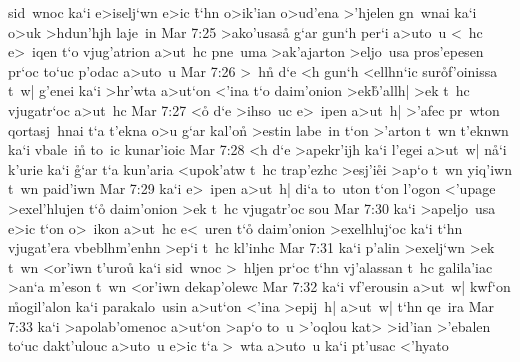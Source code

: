 sid~wnoc
ka`i
e>iselj`wn
e>ic
\r{t}`hn
o>ik'ian
o>ud'ena
>'hjelen
gn~wnai
ka`i
o>uk
>hdun'hjh
laje~in\bibvsend
\vs Mar 7:25
>ako'usasa\r{}
g`ar
gun`h
per`i
a>uto~u
<~hc
e>~iqen
t`o
vjug'atrion
a>ut~hc
pne~uma
>ak'ajarton
>eljo~usa
pros'epesen
pr`oc
to`uc
p'odac
a>uto~u\bibvsend
\vs Mar 7:26
>~hn\r{}
d`e
<h
gun`h
<ellhn`ic
sur\r{o}f'oinissa
t~w|
g'enei
ka`i
>hr'wta
a>ut`on
<'ina
t`o
daim'onion
>ek\r{b}'allh|
>ek
t~hc
vjugatr`oc
a>ut~hc\bibvsend
\vs Mar 7:27
<o\r{}
d`e
>ihso~uc
e>~ipen
a>ut~h|
>'afec
pr~wton
qortasj~hnai
t`a
t'ekna
o>u
g`ar
kal'on\r{}
>estin
labe~in
t`on
>'arton
t~wn
t'eknwn
ka`i
vbale~in\r{}
to~ic
kunar'ioic\bibvsend
\vs Mar 7:28
<h
d`e
>apekr'ijh
ka`i
l'egei
a>ut~w|
n\r{a}`i
k'urie
ka`i
\r{g}`ar
t`a
kun'aria
<upok'atw
t~hc
trap'ezhc
>esj'i\r{e}i
>ap`o
t~wn
yiq'iwn
t~wn
paid'iwn\bibvsend
\vs Mar 7:29
ka`i
e>~ipen
a>ut~h|
di`a
to~uton
t`on
l'ogon
<'upage
>exel'hlujen
t`o\r{}
daim'onion
>ek
t~hc
vjugatr'oc
sou\bibvsend
\vs Mar 7:30
ka`i
>apeljo~usa
e>ic
t`on
o>~ikon
a>ut~hc
e<~uren
t`o\r{}
daim'onion
>exelhluj`oc
ka`i
t`hn
vjugat'era
vbeblhm'enhn
>ep`i
t~hc
kl'inhc\bibvsend
\vs Mar 7:31
ka`i
p'alin
>exelj`wn
>ek
t~wn
<or'iwn
t'urou\r{}
ka`i
sid~wnoc
>~hljen
pr`oc
t`hn
vj'alassan
t~hc
galila'iac
>an`a
m'eson
t~wn
<or'iwn
dekap'olewc\bibvsend
\vs Mar 7:32
ka`i
vf'erousin
a>ut~w|
kwf`on
\r{m}ogil'alon
ka`i
parakalo~usin
a>ut`on
<'ina
>epij~h|
a>ut~w|
t`hn
qe~ira\bibvsend
\vs Mar 7:33
ka`i
>apolab'omenoc
a>ut`on
>ap`o
to~u
>'oqlou
kat>
>id'ian
>'ebalen
to`uc
dakt'ulouc
a>uto~u
e>ic
t`a
>~wta
a>uto~u
ka`i
pt'usac
<'hyato
